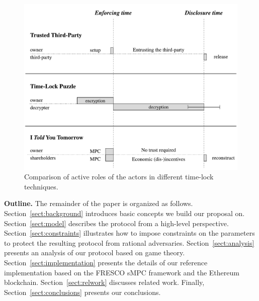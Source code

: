 \begin{figure}[t]
	\centering
	\includegraphics[width=\textwidth]{fig/models}
	\caption{Comparison of active roles of the actors in different time-lock techniques. }
	\label{fig:models}
\end{figure}


\medskip\textbf{Outline.} The remainder of the paper is organized as follows.
%
Section~\ref{sect:background} introduces basic concepts we build our proposal on. 
%
Section~\ref{sect:model} describes the \shortname protocol from a high-level perspective.
%
Section~\ref{sect:constraints} illustrates how to impose constraints on the parameters to protect the resulting protocol from rational adversaries.
%
Section~\ref{sect:analysis} presents an analysis of our protocol based on game theory.
%
Section~\ref{sect:implementation} presents the details of our reference implementation based on the FRESCO sMPC framework and the Ethereum blockchain.
%
Section~\ref{sect:relwork} discusses related work.
%
Finally, Section~\ref{sect:conclusions} presents our conclusions.
